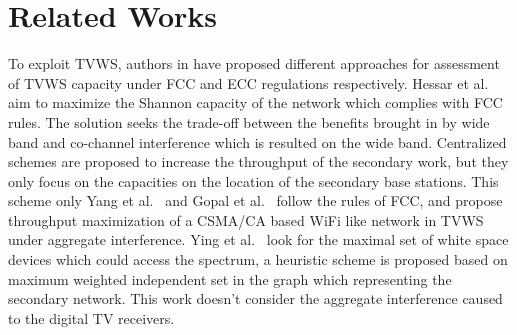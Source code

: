 \documentclass[times]{ettauth}
\theoremstyle{mytheoremstyle}
\theoremstyle{mytheoremstyle}
\theoremstyle{mytheoremstyle}
\begin{document}
\section{Related Works}
\label{decomposition_relatedwork}




To exploit TVWS, authors in \cite{DySpAN10MeasuringWhitespaceCapacity, HessarTMC15, Deshmukh2015, Achtzehn12} have proposed different approaches for assessment of TVWS capacity under FCC and ECC regulations respectively.
Hessar et al.~\cite{ReAlloTVWS14DySPAN} aim to maximize the Shannon capacity of the network which complies with FCC rules.
The solution seeks the trade-off between the benefits brought in by wide band and co-channel interference which is resulted on the wide band.
Centralized schemes are proposed to increase the throughput of the secondary work, but they only focus on the capacities on the location of the secondary base stations.
This scheme only 
Yang et al.~\cite{yang2013WiFiWSTVCapacity} and Gopal et al.~\cite{gopalTCCN16} follow the rules of FCC, and propose throughput maximization of a CSMA/CA based WiFi like network in TVWS under aggregate interference.
Ying et al.~\cite{Ying2018DySPAN} look for the maximal set of white space devices which could access the spectrum, a heuristic scheme is proposed based on maximum weighted independent set in the graph which representing the secondary network.
This work doesn't consider the aggregate interference caused to the digital TV receivers.
\end{document}
